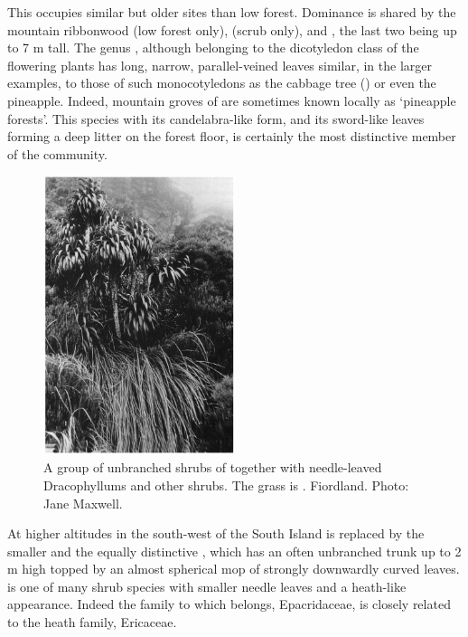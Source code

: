 This occupies similar but older sites than  low forest.
Dominance is shared by the mountain ribbonwood (low forest only),  (scrub only),  and , the last two being up to 7 m tall.
The genus , although belonging to the dicotyledon class of the flowering plants has long, narrow, parallel-veined leaves similar, in the larger examples, to those of such monocotyledons as the cabbage tree () or even the pineapple.
Indeed, mountain groves of  are sometimes known locally as `pineapple forests'.
This species with its candelabra-like form, and its sword-like leaves forming a deep litter on the forest floor, is certainly the most distinctive member of the community.

\begin{figure}
	\includegraphics[width=0.5\textwidth]{graphics/figure92dracophyllum.jpg}
	\centering
	\caption[A group of unbranched shrubs of Dracophyllum fiordense]{A group of unbranched shrubs of  together with needle-leaved Dracophyllums and other shrubs.
    The grass is .
    Fiordland.
	Photo: Jane Maxwell.}
	\label{fig:92dracophyllum}
\end{figure}

At higher altitudes in the south-west of the South Island  is replaced by the smaller  and the equally distinctive , which has an often unbranched trunk up to 2 m high topped by an almost spherical mop of strongly downwardly curved leaves.  is one of many shrub species with smaller needle leaves and a heath-like appearance.
Indeed the family to which  belongs, Epacridaceae, is closely related to the heath family, Ericaceae.

